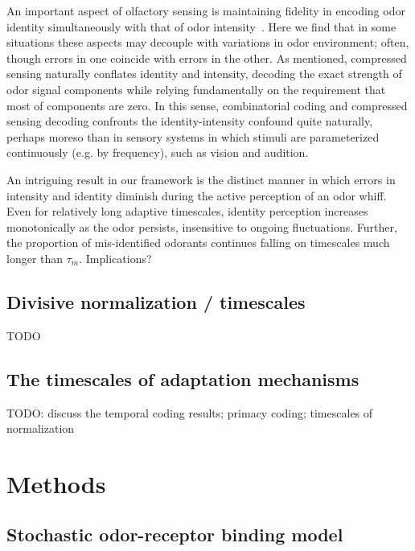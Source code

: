 An important aspect of olfactory sensing is maintaining fidelity in encoding odor identity simultaneously with that of odor intensity~\cite{Laruents papers}. Here we find that in some situations these aspects may decouple with variations in odor environment; often, though errors in one coincide with errors in the other. As mentioned, compressed sensing naturally conflates identity and intensity, decoding the exact strength of odor signal components while relying fundamentally on the requirement that most of components are zero. In this sense, combinatorial coding and compressed sensing decoding confronts the identity-intensity confound quite naturally, perhaps moreso than in sensory systems in which stimuli are parameterized continuously (e.g. by frequency), such as vision and audition.

An intriguing result in our framework is the distinct manner in which errors in intensity and identity diminish during the active perception of an odor whiff. Even for relatively long adaptive timescales, identity perception increases monotonically as the odor persists, insensitive to ongoing fluctuations. Further, the proportion of mis-identified odorants continues falling on timescales much longer than $\tau_m$. {\color{blue} Implications?}


\subsection{Divisive normalization / timescales}
{\color{blue} TODO}

\subsection{The timescales of adaptation mechanisms}
{\color{blue} TODO: discuss the temporal coding results; primacy coding; timescales of normalization}


\section{Methods}

\subsection{Stochastic odor-receptor binding model}

